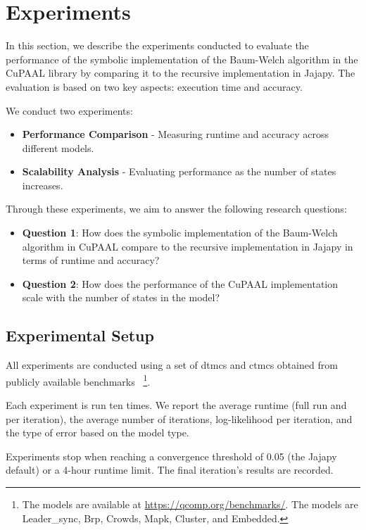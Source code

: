\section{Experiments}\label{sec:experiments}
In this section, we describe the experiments conducted to evaluate the performance of the symbolic implementation of the Baum-Welch algorithm in the CuPAAL library by comparing it to the recursive implementation in Jajapy. The evaluation is based on two key aspects: execution time and accuracy.

We conduct two experiments:
\begin{itemize}
    \item \textbf{Performance Comparison} - Measuring runtime and accuracy across different models.
    \item \textbf{Scalability Analysis} - Evaluating performance as the number of states increases.
\end{itemize}

Through these experiments, we aim to answer the following research questions:
\begin{itemize}
    \item \textbf{Question 1}: How does the symbolic implementation of the Baum-Welch algorithm in CuPAAL compare to the recursive implementation in Jajapy in terms of runtime and accuracy?
    \item \textbf{Question 2}: How does the performance of the CuPAAL implementation scale with the number of states in the model?
\end{itemize}

\subsection{Experimental Setup}
All experiments are conducted using a set of \glspl{dtmc} and \glspl{ctmc} obtained from publicly available benchmarks~\cite{hartmanns2019quantitative}
\footnote{The models are available at \url{https://qcomp.org/benchmarks/}. The models are Leader\_sync, Brp, Crowds, Mapk, Cluster, and Embedded.}.

Each experiment is run ten times.
We report the average runtime (full run and per iteration), the average number of iterations, log-likelihood per iteration, and the type of error based on the model type.

Experiments stop when reaching a convergence threshold of 0.05 (the Jajapy default) or a 4-hour runtime limit. The final iteration's results are recorded.

